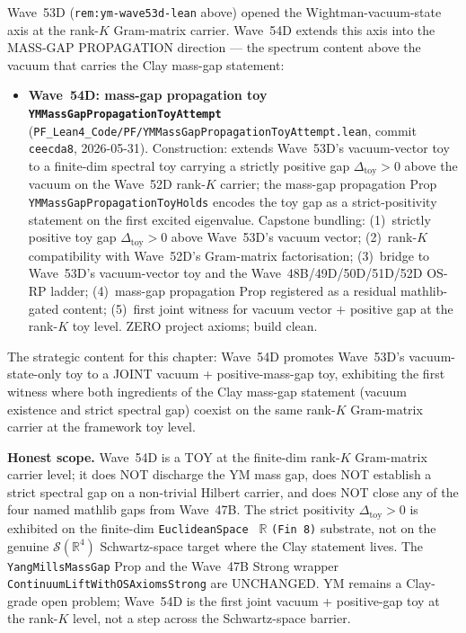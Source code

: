\begin{remark}\label{rem:ym-wave54d-lean}
Wave~53D (\texttt{rem:ym-wave53d-lean} above) opened the Wightman-vacuum-state axis at the rank-$K$ Gram-matrix carrier. Wave~54D extends this axis into the MASS-GAP PROPAGATION direction --- the spectrum content above the vacuum that carries the Clay mass-gap statement:
\begin{itemize}
  \item \textbf{Wave~54D: mass-gap propagation toy \texttt{YMMassGapPropagationToyAttempt}} (\texttt{PF\_Lean4\_Code/PF/YMMassGapPropagationToyAttempt.lean}, commit \texttt{ceecda8}, 2026-05-31). Construction: extends Wave~53D's vacuum-vector toy to a finite-dim spectral toy carrying a strictly positive gap $\Delta_{\mathrm{toy}} > 0$ above the vacuum on the Wave~52D rank-$K$ carrier; the mass-gap propagation Prop \texttt{YMMassGapPropagationToyHolds} encodes the toy gap as a strict-positivity statement on the first excited eigenvalue. Capstone bundling: (1)~strictly positive toy gap $\Delta_{\mathrm{toy}} > 0$ above Wave~53D's vacuum vector; (2)~rank-$K$ compatibility with Wave~52D's Gram-matrix factorisation; (3)~bridge to Wave~53D's vacuum-vector toy and the Wave~48B/49D/50D/51D/52D OS-RP ladder; (4)~mass-gap propagation Prop registered as a residual mathlib-gated content; (5)~first joint witness for vacuum vector $+$ positive gap at the rank-$K$ toy level. ZERO project axioms; build clean.
\end{itemize}
The strategic content for this chapter: Wave~54D promotes Wave~53D's vacuum-state-only toy to a JOINT vacuum + positive-mass-gap toy, exhibiting the first witness where both ingredients of the Clay mass-gap statement (vacuum existence and strict spectral gap) coexist on the same rank-$K$ Gram-matrix carrier at the framework toy level.

\textbf{Honest scope.} Wave~54D is a TOY at the finite-dim rank-$K$ Gram-matrix carrier level; it does NOT discharge the YM mass gap, does NOT establish a strict spectral gap on a non-trivial Hilbert carrier, and does NOT close any of the four named mathlib gaps from Wave~47B. The strict positivity $\Delta_{\mathrm{toy}} > 0$ is exhibited on the finite-dim \texttt{EuclideanSpace } $\mathbb{R}$ \texttt{(Fin 8)} substrate, not on the genuine $\mathcal{S}(\mathbb{R}^4)$ Schwartz-space target where the Clay statement lives. The \texttt{YangMillsMassGap} Prop and the Wave~47B Strong wrapper \texttt{ContinuumLiftWithOSAxiomsStrong} are UNCHANGED. YM remains a Clay-grade open problem; Wave~54D is the first joint vacuum + positive-gap toy at the rank-$K$ level, not a step across the Schwartz-space barrier.
\end{remark}

